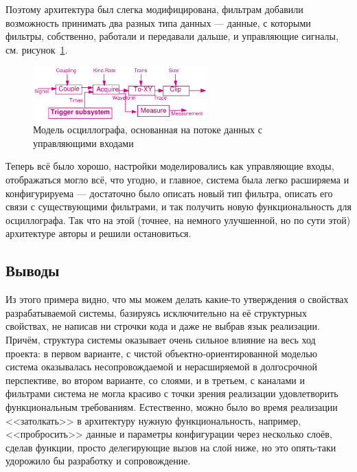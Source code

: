 \documentclass[a5paper]{article}
\begin{document}
Поэтому архитектура был слегка модифицирована, фильтрам добавили возможность принимать два разных типа данных --- данные, с которыми фильтры, собственно, работали и передавали дальше, и управляющие сигналы, см. рисунок~\ref{figure:oscilloscopeModifiedFilters}.

\begin{figure}
    \begin{center}
        \includegraphics[width=0.6\textwidth]{oscilloscopeModifiedFilters.png}
    \end{center}
    \caption{Модель осциллографа, основанная на потоке данных с управляющими входами}
    \label{figure:oscilloscopeModifiedFilters}
\end{figure}

Теперь всё было хорошо, настройки моделировались как управляющие входы, отображаться могло всё, что угодно, и главное, система была легко расширяема и конфигурируема --- достаточно было описать новый тип фильтра, описать его связи с существующими фильтрами, и так получить новую функциональность для осциллографа. Так что на этой (точнее, на немного улучшенной, но по сути этой) архитектуре авторы и решили остановиться.

\subsection{Выводы}

Из этого примера видно, что мы можем делать какие-то утверждения о свойствах разрабатываемой системы, базируясь исключительно на её структурных свойствах, не написав ни строчки кода и даже не выбрав язык реализации. Причём, структура системы оказывает очень сильное влияние на весь ход проекта: в первом варианте, с чистой объектно-ориентированной моделью система оказывалась несопровождаемой и нерасширяемой в долгосрочной перспективе, во втором варианте, со слоями, и в третьем, с каналами и фильтрами система не могла красиво с точки зрения реализации удовлетворить функциональным требованиям. Естественно, можно было во время реализации <<затолкать>> в архитектуру нужную функциональность, например, <<пробросить>> данные и параметры конфигурации через несколько слоёв, сделав функции, просто делегирующие вызов на слой ниже, но это опять-таки удорожило бы разработку и сопровождение.
\end{document}

